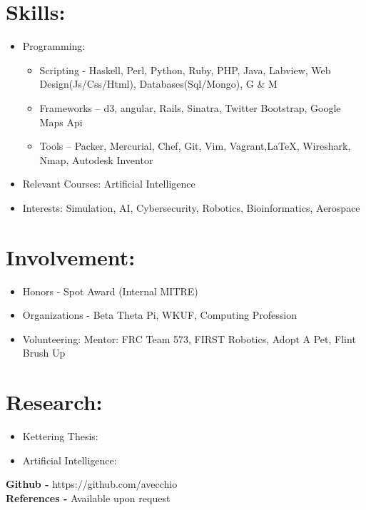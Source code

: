 \documentclass{res}
\begin{document}
\section{Skills:}
\begin{itemize}
\item Programming:
\begin{itemize}[label=$\circ$]
\item Scripting - Haskell, Perl, Python, Ruby, PHP, Java, Labview, Web Design(Js/Css/Html), Databases(Sql/Mongo), G \& M
\item Frameworks – d3, angular, Rails, Sinatra, Twitter Bootstrap, Google Maps Api
\item Tools – Packer, Mercurial, Chef, Git, Vim, Vagrant,\LaTeX, Wireshark, Nmap, Autodesk Inventor
\end{itemize}
\item Relevant Courses: Artificial Intelligence
\item Interests: Simulation, AI, Cybersecurity, Robotics, Bioinformatics, Aerospace
\end{itemize}

\section{Involvement:}
\begin{itemize}
\item Honors - Spot Award (Internal MITRE)
\item Organizations - Beta Theta Pi, WKUF, Computing Profession
\item Volunteering: Mentor: FRC Team 573, FIRST Robotics, Adopt A Pet, Flint Brush Up
\end{itemize}

\section{Research:}
\begin{itemize}
\item Kettering Thesis: 
\item Artificial Intelligence:
\end{itemize}

\begin{center}
\textbf{Github - }https://github.com/avecchio\\
\textbf{References - }Available upon request
\end{center}
\end{document}
